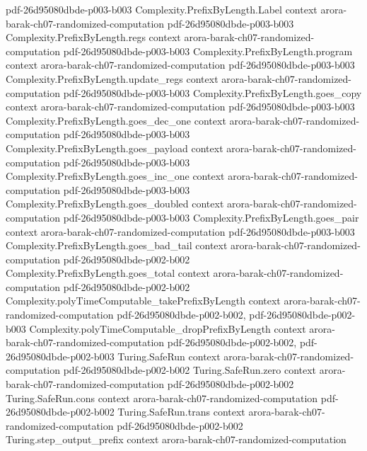 \begin{theorem}
  {pdf-26d95080dbde-p003-b003}
\proofstep
  {Complexity.PrefixByLength.Label}
  {context}
  {arora-barak-ch07-randomized-computation}
  {pdf-26d95080dbde-p003-b003}
\proofstep
  {Complexity.PrefixByLength.regs}
  {context}
  {arora-barak-ch07-randomized-computation}
  {pdf-26d95080dbde-p003-b003}
\proofstep
  {Complexity.PrefixByLength.program}
  {context}
  {arora-barak-ch07-randomized-computation}
  {pdf-26d95080dbde-p003-b003}
\proofstep
  {Complexity.PrefixByLength.update_regs}
  {context}
  {arora-barak-ch07-randomized-computation}
  {pdf-26d95080dbde-p003-b003}
\proofstep
  {Complexity.PrefixByLength.goes_copy}
  {context}
  {arora-barak-ch07-randomized-computation}
  {pdf-26d95080dbde-p003-b003}
\proofstep
  {Complexity.PrefixByLength.goes_dec_one}
  {context}
  {arora-barak-ch07-randomized-computation}
  {pdf-26d95080dbde-p003-b003}
\proofstep
  {Complexity.PrefixByLength.goes_payload}
  {context}
  {arora-barak-ch07-randomized-computation}
  {pdf-26d95080dbde-p003-b003}
\proofstep
  {Complexity.PrefixByLength.goes_inc_one}
  {context}
  {arora-barak-ch07-randomized-computation}
  {pdf-26d95080dbde-p003-b003}
\proofstep
  {Complexity.PrefixByLength.goes_doubled}
  {context}
  {arora-barak-ch07-randomized-computation}
  {pdf-26d95080dbde-p003-b003}
\proofstep
  {Complexity.PrefixByLength.goes_pair}
  {context}
  {arora-barak-ch07-randomized-computation}
  {pdf-26d95080dbde-p003-b003}
\proofstep
  {Complexity.PrefixByLength.goes_bad_tail}
  {context}
  {arora-barak-ch07-randomized-computation}
  {pdf-26d95080dbde-p002-b002}
\proofstep
  {Complexity.PrefixByLength.goes_total}
  {context}
  {arora-barak-ch07-randomized-computation}
  {pdf-26d95080dbde-p002-b002}
\proofstep
  {Complexity.polyTimeComputable_takePrefixByLength}
  {context}
  {arora-barak-ch07-randomized-computation}
  {pdf-26d95080dbde-p002-b002,
    pdf-26d95080dbde-p002-b003}
\proofstep
  {Complexity.polyTimeComputable_dropPrefixByLength}
  {context}
  {arora-barak-ch07-randomized-computation}
  {pdf-26d95080dbde-p002-b002,
    pdf-26d95080dbde-p002-b003}
\proofstep
  {Turing.SafeRun}
  {context}
  {arora-barak-ch07-randomized-computation}
  {pdf-26d95080dbde-p002-b002}
\proofstep
  {Turing.SafeRun.zero}
  {context}
  {arora-barak-ch07-randomized-computation}
  {pdf-26d95080dbde-p002-b002}
\proofstep
  {Turing.SafeRun.cons}
  {context}
  {arora-barak-ch07-randomized-computation}
  {pdf-26d95080dbde-p002-b002}
\proofstep
  {Turing.SafeRun.trans}
  {context}
  {arora-barak-ch07-randomized-computation}
  {pdf-26d95080dbde-p002-b002}
\proofstep
  {Turing.step_output_prefix}
  {context}
  {arora-barak-ch07-randomized-computation}

\end{theorem}
